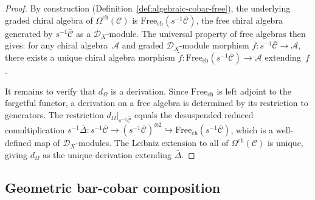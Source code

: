 \begin{proof}
By construction (Definition~\ref{def:algebraic-cobar-free}), the
underlying graded chiral algebra of $\Omega^{\mathrm{ch}}(\mathcal{C})$
is $\mathrm{Free}_{\mathrm{ch}}(s^{-1}\bar{\mathcal{C}})$, the free
chiral algebra generated by $s^{-1}\bar{\mathcal{C}}$ as a
$\mathcal{D}_X$-module. The universal property of free algebras then
gives: for any chiral algebra~$\mathcal{A}$ and graded
$\mathcal{D}_X$-module morphism
$f\colon s^{-1}\bar{\mathcal{C}} \to \mathcal{A}$, there exists a
unique chiral algebra morphism
$\tilde{f}\colon \mathrm{Free}_{\mathrm{ch}}(s^{-1}\bar{\mathcal{C}})
\to \mathcal{A}$ extending~$f$.

It remains to verify that $d_\Omega$ is a derivation. Since $\mathrm{Free}_{\mathrm{ch}}$ is left adjoint to the forgetful functor, a derivation on a free algebra is determined by its restriction to generators. The restriction $d_\Omega|_{s^{-1}\bar{\mathcal{C}}}$ equals the desuspended reduced comultiplication $s^{-1}\bar{\Delta}\colon s^{-1}\bar{\mathcal{C}} \to (s^{-1}\bar{\mathcal{C}})^{\otimes 2} \hookrightarrow \mathrm{Free}_{\mathrm{ch}}(s^{-1}\bar{\mathcal{C}})$, which is a well-defined map of $\mathcal{D}_X$-modules. The Leibniz extension to all of $\Omega^{\mathrm{ch}}(\mathcal{C})$ is unique, giving $d_\Omega$ as the unique derivation extending $\bar{\Delta}$.
\end{proof}

\subsection{Geometric bar-cobar composition}


